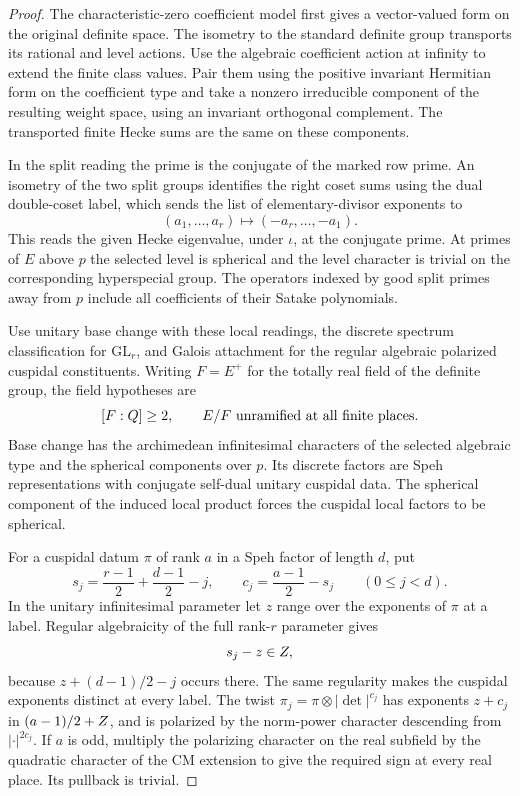 \begin{proof}
The characteristic-zero coefficient model first gives
a vector-valued form on the original definite space.
The isometry to the standard definite group transports
its rational and level actions. Use the algebraic
coefficient action at infinity to extend the finite
class values. Pair them using the positive invariant
Hermitian form on the coefficient type and take a
nonzero irreducible component of the resulting weight
space, using an invariant orthogonal complement.
The transported finite Hecke sums are the same on these
components.

In the split reading the prime is the
conjugate of the marked row prime. An isometry of the
two split groups identifies the right coset sums using
the dual double-coset label, which sends the list of elementary-divisor exponents to
\[
 (a_1,\ldots,a_r)\longmapsto(-a_r,\ldots,-a_1).
\]
This reads the given
Hecke eigenvalue, under \(\iota\), at the conjugate
prime. At primes of \(E\) above \(p\) the selected
level is spherical and the level character is trivial
on the corresponding hyperspecial group. The operators
indexed by good split primes away from \(p\) include
all coefficients of their Satake polynomials.
\label{cor:lift-frame-galois-2}

Use unitary base change
with these local readings, the discrete spectrum
classification for \(\mathrm{GL}_r\), and Galois
attachment for the regular algebraic polarized cuspidal
constituents. Writing \(F=E^+\) for the totally real field of the definite group, the field hypotheses are
\[
 [F:Q]\ge2,\qquad E/F\text{ unramified at all finite places}.
\] Base change has the
archimedean infinitesimal characters of the selected
algebraic type and the spherical components over \(p\).
Its discrete factors are Speh representations with
conjugate self-dual unitary cuspidal data. The spherical
component of the induced local product forces the
cuspidal local factors to be spherical.

For a cuspidal datum \(\pi\) of rank \(a\) in a Speh factor
of length \(d\), put
\[
 s_j=\frac{r-1}{2}+\frac{d-1}{2}-j,
 \qquad c_j=\frac{a-1}{2}-s_j \qquad (0\le j<d).
\]
In the unitary infinitesimal parameter let \(z\) range over
the exponents of \(\pi\) at a label. Regular algebraicity of
the full rank-\(r\) parameter gives
\[
 s_j-z\in Z,
\]
because
\(z+(d-1)/2-j\) occurs there. The same regularity makes the
cuspidal exponents distinct at every label. The twist
\(\pi_j=\pi\otimes |\det|^{c_j}\) has exponents \(z+c_j\)
in \((a-1)/2+Z\), and is polarized by the norm-power
character descending from \(|\cdot|^{2c_j}\). If \(a\) is odd,
multiply the polarizing character on the real subfield by
the quadratic character of the CM extension to give the
required sign at every real place. Its pullback is trivial.


\end{proof}
